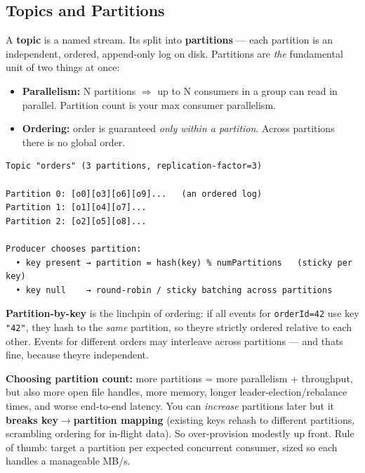 \documentclass[11pt]{article}
\providecommand{\tightlist}{\setlength{\itemsep}{1pt}\setlength{\parskip}{0pt}}
\begin{document}
\subsection{Topics and Partitions}\label{topics-and-partitions}

A \textbf{topic} is a named stream. It\textquotesingle s split into \textbf{partitions} --- each partition is an independent, ordered, append-only log on disk. Partitions are \emph{the} fundamental unit of two things at once:

\begin{itemize}
\tightlist
\item
  \textbf{Parallelism:} N partitions \(\Rightarrow\) up to N consumers in a group can read in parallel. Partition count is your max consumer parallelism.
\item
  \textbf{Ordering:} order is guaranteed \emph{only within a partition}. Across partitions there is no global order.
\end{itemize}

\setcodelang{}

\begin{verbatim}
Topic "orders" (3 partitions, replication-factor=3)

Partition 0: [o0][o3][o6][o9]...   (an ordered log)
Partition 1: [o1][o4][o7]...
Partition 2: [o2][o5][o8]...

Producer chooses partition:
  • key present → partition = hash(key) % numPartitions   (sticky per key)
  • key null    → round-robin / sticky batching across partitions
\end{verbatim}

\textbf{Partition-by-key} is the linchpin of ordering: if all events for \texttt{orderId=42} use key \texttt{"42"}, they hash to the \emph{same} partition, so they\textquotesingle re strictly ordered relative to each other. Events for different orders may interleave across partitions --- and that\textquotesingle s fine, because they\textquotesingle re independent.

\textbf{Choosing partition count:} more partitions = more parallelism + throughput, but also more open file handles, more memory, longer leader-election/rebalance times, and worse end-to-end latency. You can \emph{increase} partitions later but it \textbf{breaks key\(\rightarrow\)partition mapping} (existing keys rehash to different partitions, scrambling ordering for in-flight data). So over-provision modestly up front. Rule of thumb: target a partition per expected concurrent consumer, sized so each handles a manageable MB/s.
\end{document}

